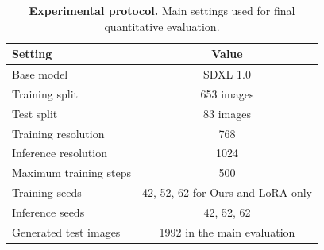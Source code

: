 \begin{table}[t]
\centering
\small
\caption{\textbf{Experimental protocol.} Main settings used for final quantitative evaluation.}
\label{tab:experimental-protocol}
\begin{tabular}{lc}
\toprule
\textbf{Setting} & \textbf{Value} \\
\midrule
Base model & SDXL 1.0 \\
Training split & 653 images \\
Test split & 83 images \\
Training resolution & 768 \\
Inference resolution & 1024 \\
Maximum training steps & 500 \\
Training seeds & 42, 52, 62 for Ours and LoRA-only \\
Inference seeds & 42, 52, 62 \\
Generated test images & 1992 in the main evaluation \\
\bottomrule
\end{tabular}
\end{table}
